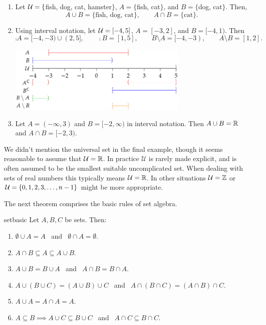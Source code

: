 \begin{examples}{}{}
\begin{enumerate}
\item Let $\mathcal{U}=\{$fish, dog, cat, hamster$\}$, $A=\{$fish, cat$\}$, and $B=\{$dog, cat$\}$. Then,
\[A\cup B=\{\text{fish, dog, cat}\},\qquad A\cap B=\{\text{cat}\}.\]
\item Using interval notation, let $\mathcal{U}=[-4,5]$, $A=[-3,2]$, and $B=[-4,1)$. Then
\[\comp A=[-4,-3)\cup (2,5],\qquad \comp B=[1,5],\qquad B\setminus A=[-4,-3),\qquad A\setminus B=[1,2].\]
\vspace{-24pt}
\begin{center}
\includegraphics[width=0.7\textwidth]{sets-13-intervalex}
\end{center}\vspace{-13pt}
\item Let $A=(-\infty,3)$ and $B=[-2,\infty)$ in interval notation. Then $A\cup B=\mathbb{R}$ and $A\cap B=[-2,3)$.
\end{enumerate}
\end{examples}

We didn't mention the universal set in the final example, though it seems reasonable to assume that $\mathcal{U}=\mathbb{R}$. In practice $\mathcal U$ is rarely made explicit, and is often assumed to be the smallest suitable uncomplicated set. When dealing with sets of real numbers this typically means $\mathcal{U}=\mathbb{R}$. In other situations $\mathcal{U}=\mathbb{Z}$ or $\mathcal{U}=\{0,1,2,3,\ldots,n-1\}$ might be more appropriate.\par

The next theorem comprises the basic rules of set algebra.

\begin{thm}{}{setbasic}
Let $A,B,C$ be sets. Then:
\begin{enumerate}\setlength{\itemsep}{0pt}
\item $\emptyset\cup A=A$ \ and \ $\emptyset\cap A=\emptyset$.
\item $A\cap B\subseteq A\subseteq A\cup B$.
\item $A\cup B=B\cup A$ \ and \ $A\cap B=B\cap A$.
\item $A\cup (B\cup C)=(A\cup B)\cup C$ \ and \ $A\cap (B\cap C)=(A\cap B)\cap C$.
\item $A\cup A=A\cap A=A$.
\item $A\subseteq B\implies A\cup C\subseteq B\cup C$ \ and \ $A\cap C\subseteq B\cap C$.
\end{enumerate}
\end{thm}

